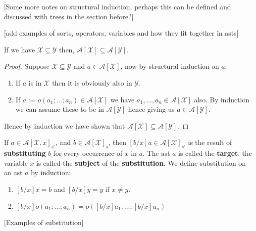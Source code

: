 [Some more notes on structural induction, perhaps this can be defined and discussed with trees in the section before?]

[add examples of sorts, operators, variables and how they fit together in asts]

\begin{lemma}
    If we have $\mathcal{X} \subseteq \mathcal{Y}$ then, $\mathcal{A}[\mathcal{X}] \subseteq \mathcal{A}[\mathcal{Y}]$.
\end{lemma}
\begin{proof}
    Suppose $\mathcal{X} \subseteq \mathcal{Y}$ and $a \in \mathcal{A}[\mathcal{X}]$, now by structural induction on $a$:
    
    \begin{enumerate}
        \item If $a$ is in $\mathcal{X}$ then it is obviously also in $\mathcal{Y}$.
        \item If $a := o(a_1;\dots;a_n) \in \mathcal{A}[\mathcal{X}]$ we have $a_1, \dots, a_n\in \mathcal{A}[\mathcal{X}]$ also. By induction we can assume these to be in $\mathcal{A}[\mathcal{Y}]$ hence giving us $a \in \mathcal{A}[\mathcal{Y}]$.
    \end{enumerate}
    
    Hence by induction we have shown that $\mathcal{A}[\mathcal{X}] \subseteq \mathcal{A}[\mathcal{Y}]$.
\end{proof}

\begin{defin}[Substitution]\label{sub}
    If $a \in \mathcal{A}[\mathcal{X},x]_{s'}$, and $b \in \mathcal{A}[\mathcal{X}]_s$, then $[b/x]a \in \mathcal{A}[\mathcal{X}]_{s'}$ is the result of \textbf{substituting} $b$ for every occurrence of $x$ in $a$. The ast $a$ is called the \textbf{target}, the variable $x$ is called the \textbf{subject} of the \textbf{substitution}. We define substitution on an ast $a$ by induction:
    \begin{enumerate}
        \item $[b/x]x = b$ and $[b/x]y = y$ if $x\ne y$.
        \item $[b/x]o(a_1;\dots;a_n)=o([b/x]a_1;\dots;[b/x]a_n)$
    \end{enumerate}
\end{defin}

[Examples of substitution]

